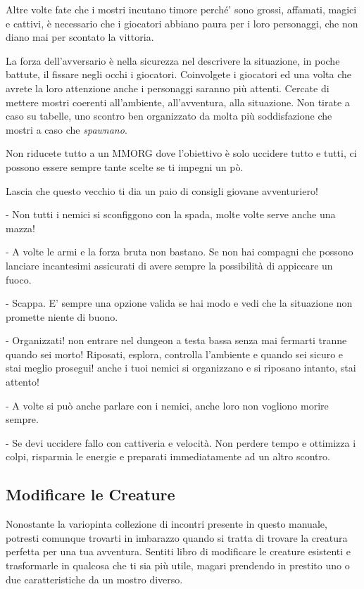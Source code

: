 \begin{multicols}{2}
Altre volte fate che i mostri incutano timore perché' sono grossi, affamati, magici e cattivi, è necessario che i giocatori abbiano paura per i loro personaggi, che non diano mai per scontato la vittoria.

La forza dell'avversario è nella sicurezza nel descrivere la situazione, in poche battute, il fissare negli occhi i giocatori. Coinvolgete i giocatori ed una volta che avrete la loro attenzione anche i personaggi saranno più attenti. Cercate di mettere mostri coerenti all'ambiente, all'avventura, alla situazione. Non tirate a caso su tabelle, uno scontro ben organizzato da molta più soddisfazione che mostri a caso che \emph{spawnano}.

Non riducete tutto a un MMORG dove l'obiettivo è solo uccidere tutto e tutti, ci possono essere sempre tante scelte se ti impegni un pò.

\begin{giocatore}
{
Lascia che questo vecchio ti dia un paio di consigli giovane avventuriero!

- Non tutti i nemici si sconfiggono con la spada, molte volte serve anche una mazza!

- A volte le armi e la forza bruta non bastano. Se non hai compagni che possono lanciare incantesimi assicurati di avere sempre la possibilità di appiccare un fuoco.

- Scappa. E' sempre una opzione valida se hai modo e vedi che la situazione non promette niente di buono.

- Organizzati! non entrare nel dungeon a testa bassa senza mai fermarti tranne quando sei morto! Riposati, esplora, controlla l'ambiente e quando sei sicuro e stai meglio prosegui! anche i tuoi nemici si organizzano e si riposano intanto, stai attento!

- A volte si può anche parlare con i nemici, anche loro non vogliono morire sempre.

- Se devi uccidere fallo con cattiveria e velocità. Non perdere tempo e ottimizza i colpi, risparmia le energie e preparati immediatamente ad un altro scontro.

}\end{giocatore}

\subsection{Modificare le Creature}

Nonostante la variopinta collezione di incontri presente in questo manuale, potresti comunque trovarti in imbarazzo quando si tratta di trovare la creatura perfetta per una tua avventura. Sentiti libro di modificare le creature esistenti e trasformarle in qualcosa che ti sia più utile, magari prendendo in prestito uno o due caratteristiche da un mostro diverso.


\end{multicols}
